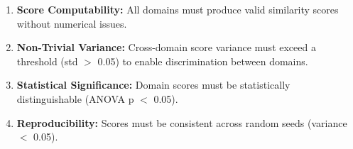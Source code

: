 \begin{enumerate}
    \item \textbf{Score Computability:} All domains must produce valid similarity scores without numerical issues.

    \item \textbf{Non-Trivial Variance:} Cross-domain score variance must exceed a threshold (std $>$ 0.05) to enable discrimination between domains.

    \item \textbf{Statistical Significance:} Domain scores must be statistically distinguishable (ANOVA p $<$ 0.05).

    \item \textbf{Reproducibility:} Scores must be consistent across random seeds (variance $<$ 0.05).
\end{enumerate}
